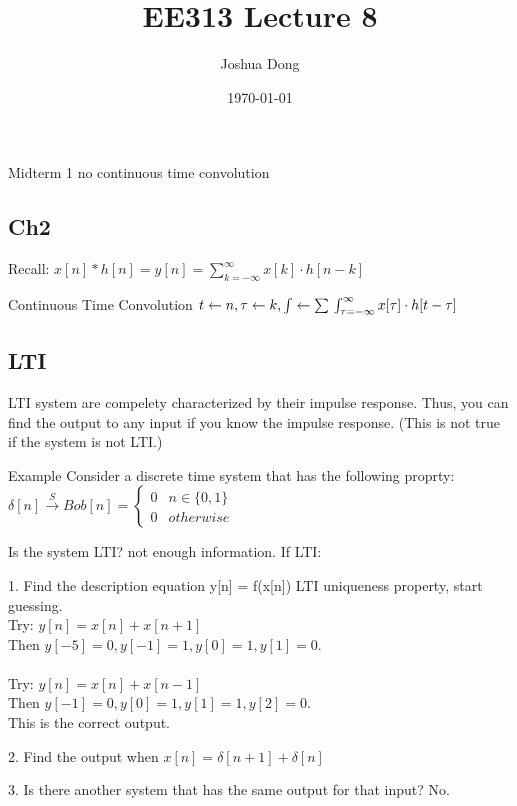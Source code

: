 \documentclass{article}
\begin{document}
\title{EE313\: Lecture 8}
\author{Joshua Dong}
\date{\today}
\maketitle

Midterm 1 no continuous time convolution

\subsection{Ch2}
Recall: $x[n] * h[n] = y[n] =
\sum\limits_{k = -\infty}^\infty x[k] \cdot h[n-k]$
\begin{description}
    \item{Continuous Time Convolution}
        $t \leftarrow n, \tau \leftarrow k, \int \leftarrow \sum
        \\\int_{\tau = -\infty}^\infty x[\tau] \cdot h[t-\tau]$
\end{description}

\subsection{LTI}
LTI system are compelety characterized by their impulse response.
Thus, you can find the output to any input if you know the impulse response.
(This is not true if the system is not LTI.)

\begin{description}
    \item{Example}
        Consider a discrete time system that has the following proprty:
        \\$\delta[n] \xrightarrow{S} Bob[n] = 
        \begin{cases} 
                0 & n\in\{0,1\} \\
                0 & otherwise
        \end{cases}$
    \item{Is the system LTI?}
        not enough information. If LTI:
    \item{1. Find the description equation y[n] = f(x[n])}
        LTI uniqueness property, start guessing.
        \\Try: $y[n] = x[n] + x[n+1]$
        \\Then $y[-5] = 0, y[-1] = 1, y[0] = 1, y[1] = 0$.
        \\
        \\Try: $y[n] = x[n] + x[n-1]$
        \\Then $y[-1] = 0, y[0] = 1, y[1] = 1, y[2] = 0$.
        \\This is the correct output.

    \item{2. Find the output when $x[n] = \delta[n+1] + \delta[n]$}

    \item{3. Is there another system that has the same output for that input?}
        No.

\end{description}
\end{document}
